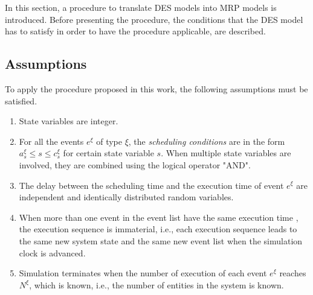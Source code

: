 \documentclass[]{interact}
\theoremstyle{plain}%
\theoremstyle{definition}
\theoremstyle{remark}
\begin{document}
In this section, a procedure to translate DES models into MRP models is introduced. Before presenting the procedure, the conditions that the DES model has to satisfy in order to have the procedure applicable, are described.

\subsection{Assumptions}

To apply the procedure proposed in this work, the following assumptions must be satisfied.


\begin{enumerate}
	\item State variables are integer.
	\item For all the events $e^{\xi}$ of type $\xi$, the \textit{scheduling conditions} are in the form $a^{\xi}_s\le s \le c^{\xi}_s$ for certain state variable $s$. When multiple state variables are involved, they are combined using the logical operator "AND".
	\item The delay between the scheduling time and the execution time of event $e^{\xi}$ are independent and identically distributed random variables. %
	\item When more than one event in the event list have the same execution time%
	, the execution sequence is immaterial, i.e., each execution sequence leads to the same new system state and the same new event list when the simulation clock is advanced.	
	\item Simulation terminates when the number of execution of each event $e^{\xi}$ reaches $N^{\xi}$, which is known, i.e., the number of entities in the system is known. 
\end{enumerate}
\end{document}
